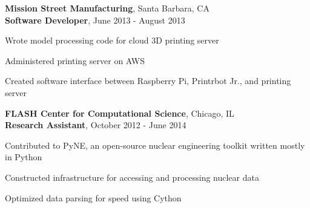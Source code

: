 \textbf{Mission Street Manufacturing}, Santa Barbara, CA \\
\textbf{Software Developer}, June 2013 - August 2013
\begin{tightlist}
  \item Wrote model processing code for cloud 3D printing server
  \item Administered printing server on AWS
  \item Created software interface between Raspberry Pi, Printrbot Jr., and printing server
\end{tightlist}
\textbf{FLASH Center for Computational Science}, Chicago, IL \\
\textbf{Research Assistant}, October 2012 - June 2014
\begin{tightlist}
  \item Contributed to PyNE, an open-source nuclear engineering toolkit written
    mostly in Python
  \item Constructed infrastructure for accessing and processing nuclear data
  \item Optimized data parsing for speed using Cython
\end{tightlist}
